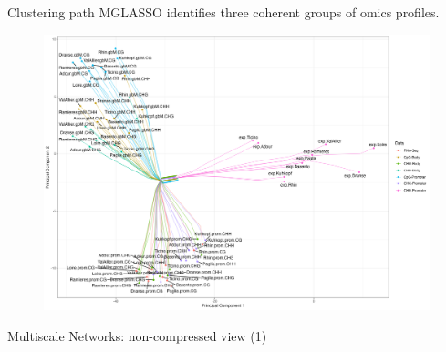 \documentclass[11pt]{beamer}
\newcommand{\emphase}[1]{\textcolor{Complement}{#1}}
\begin{document}
\begin{frame}{Clustering path}
MGLASSO identifies \emphase{three coherent groups} of omics profiles.
\begin{figure}
\centering
\includegraphics[width=0.85\linewidth]{images/cuttree-clusterpath-path-poplar-exp-meth.png}
\end{figure}


\end{frame}

\begin{frame}{Multiscale Networks: non-compressed view (1)}
\begin{figure}
\centering
{}
\end{figure}



\end{frame}
\end{document}
